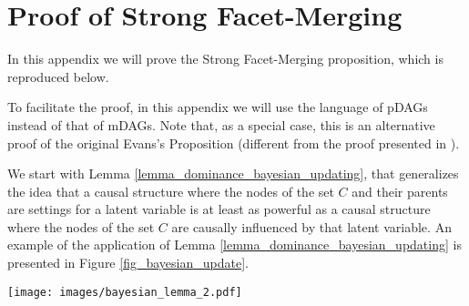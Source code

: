 \section{Proof of Strong Facet-Merging}
\label{appendix_facesplitting}

In this appendix we will prove the Strong Facet-Merging proposition, which is reproduced below.

\StrongFS*

To facilitate the proof, in this appendix we will use the language of pDAGs instead of that of mDAGs. Note that, as a special case, this is an alternative proof of the original Evans's Proposition (different from the proof presented in \cite{evans_graphs_2016}).

We start with Lemma \ref{lemma_dominance_bayesian_updating}, that generalizes the idea that a causal structure where the nodes of the set $C$ and their parents are settings for a latent variable is at least as powerful as a causal structure where the nodes of the set $C$ are causally influenced by that latent variable. An example of the application of Lemma \ref{lemma_dominance_bayesian_updating} is presented in Figure \ref{fig_bayesian_update}. 


\begin{figure*}[h!]
    \centering
    \texttt{[image: images/bayesian\_lemma\_2.pdf]}
    \caption{By Lemma \ref{lemma_dominance_bayesian_updating}, we have $\mathcal{G}_2\succeq \mathcal{G}_1$. Here, $C_1=\{t,u\}$, $C_2=\{u,v\}$, and $D=\{d\}$. Note that these two pDAGs are \emph{not} observationally equivalent: for example, $\mathcal{G}_1$ has the d-separation relation $x\dsep d$, that is not presented by $\mathcal{G}_2$. Edges that point into a latent node are represented in red.}
    \label{fig_bayesian_update}
\end{figure*}



